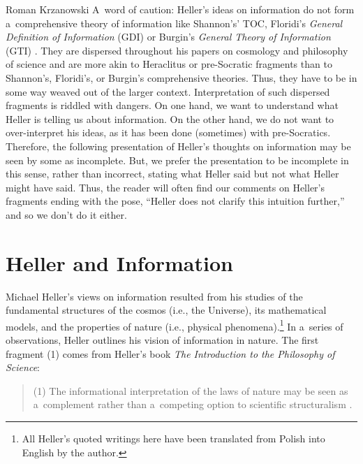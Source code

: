 \begin{artengenv}{Roman Krzanowski}
A~word of caution: Heller's ideas on information do not form a~comprehensive theory of information like Shannon's' TOC, Floridi's \textit{General Definition of Information} (GDI) 
\parencite[see, e.g.,][]{floridi_philosophy_2011} %
 or Burgin's \textit{General Theory of Information} (GTI) 
\parencite[][]{burgin_information_2003}. %
 They are dispersed throughout his papers on cosmology and philosophy of science and are more akin to Heraclitus or pre-Socratic fragments than to Shannon's, Floridi's, or Burgin's comprehensive theories. Thus, they have to be in some way weaved out of the larger context. Interpretation of such dispersed fragments is riddled with dangers. On one hand, we want to understand what Heller is telling us about information. On the other hand, we do not want to over-interpret his ideas, as it has been done (sometimes) with pre-Socratics. Therefore, the following presentation of Heller's thoughts on information may be seen by some as incomplete. But, we prefer the presentation to be incomplete in this sense, rather than incorrect, stating what Heller said but not what Heller might have said. Thus, the reader will often find our comments on Heller's fragments ending with the pose, ``Heller does not clarify this intuition further,'' and so we don't do it either.



\section{Heller and Information}

Michael Heller's views on information resulted from his studies of the fundamental structures of the cosmos (i.e., the Universe), its mathematical models, and the properties of nature (i.e., physical phenomena).\footnote{All Heller's quoted writings here have been translated from Polish into English by the author.} In a~series of observations, Heller outlines his vision of information in nature. The first fragment (1) comes from Heller's book \textit{The Introduction to the Philosophy of Science}:



\begin{quote}
(1) The informational interpretation of the laws of nature may be seen as a~complement rather than a~competing option to scientific structuralism 
\parencite[][pp.62–63]{heller_filozofia_2009}.%
\end{quote}





\end{artengenv}

